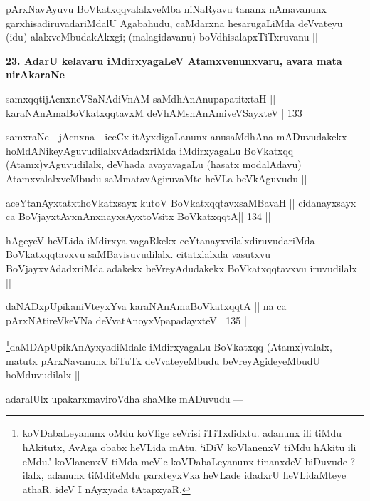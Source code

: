 \begin{artha}
pArxNavAyuvu BoVkatxqqvalalxveMba niNaRyavu tananx nAmavanunx garxhisadiruvadariMdalU Agabahudu, caMdarxna hesarugaLiMda deVvateyu (idu) alalxveMbudakAkxgi; (malagidavanu) boVdhisalapxTiTxruvanu ||
\end{artha}

\begin{artha}
{\bf 23. AdarU kelavaru iMdirxyagaLeV Atamxvenunxvaru, avara mata nirAkaraNe ---}
\end{artha}

\begin{shl}
samxqqtijAcnxneVSaNAdiVnAM saMdhAnAnupapatitxtaH ||
karaNAnAmaBoVkatxqqtavxM deVhAMshAnAmiveVSayxteV\hfill || 133 ||
\end{shl}

\begin{artha}
samxraNe - jAcnxna - iceCx itAyxdigaLanunx anusaMdhAna mADuvudakekx hoMdANikeyAguvudilalxvAdadxriMda iMdirxyagaLu BoVkatxqq (Atamx)vAguvudilalx, deVhada avayavagaLu (hasatx modalAdavu) AtamxvalalxveMbudu saMmatavAgiruvaMte heVLa beVkAguvudu ||
\end{artha}

\begin{shl}
aceYtanAyxtatxthoVkatxsayx kutoV BoVkatxqqtavxsaMBavaH ||
cidanayxsayx ca BoVjayxtAvxnAnxnayxsAyxtoV\s sitx BoVkatxqqtA\hfill || 134 ||
\end{shl}

\begin{artha}
hAgeyeV heVLida iMdirxya vagaRkekx ceYtanayxvilalxdiruvudariMda 
BoVkatxqqtavxvu saMBavisuvudilalx. citatxlalxda vasutxvu BoVjayxvAdadxriMda adakekx beVreyAdudakekx BoVkatxqqtavxvu iruvudilalx ||
\end{artha}

\begin{shl}
daNADxpUpikaniVteyxYva karaNAnAmaBoVkatxqqtA ||
na ca pArxNAtireVkeVNa deVvatA\s noyxVpapadayxteV\hfill || 135 ||
\end{shl}

\begin{artha}
\footnote{koVDabaLeyanunx oMdu koVlige seVrisi iTiTxdidxtu. adanunx ili 
tiMdu hAkitutx, AvAga obabx heVLida mAtu, `iDiV koVlanenxV tiMdu hAkitu ili eMdu.' koVlanenxV tiMda meVle koVDabaLeyanunx tinanxdeV biDuvude ? ilalx, adanunx tiMditeMdu parxteyxVka heVLade idadxrU heVLidaMteye athaR. ideV I nAyxyada tAtapxyaR.}daMDApUpikAnAyxyadiMdale iMdirxyagaLu BoVkatxqq (Atamx)valalx, matutx pArxNavanunx biTuTx deVvateyeMbudu beVreyAgideyeMbudU hoMduvudilalx ||

adaralUlx upakarxmaviroVdha shaMke mADuvudu ---
\end{artha}

